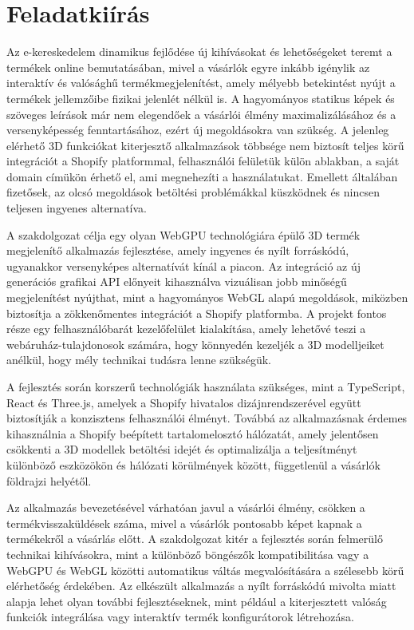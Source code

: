 \documentclass[12pt]{report}
\begin{document}
        \clearpage
        \pagestyle{plain}
        \chapter*{Feladatkiírás}
        \setcounter{page}{2}

        Az e-kereskedelem dinamikus fejlődése új kihívásokat és lehetőségeket teremt a termékek online bemutatásában, mivel a vásárlók egyre inkább igénylik az interaktív és valósághű termékmegjelenítést, amely mélyebb betekintést nyújt a termékek jellemzőibe fizikai jelenlét nélkül is. A hagyományos statikus képek és szöveges leírások már nem elegendőek a vásárlói élmény maximalizálásához és a versenyképesség fenntartásához, ezért új megoldásokra van szükség. A jelenleg elérhető 3D funkciókat kiterjesztő alkalmazások többsége nem biztosít teljes körű integrációt a Shopify platformmal, felhasználói felületük külön ablakban, a saját domain címükön érhető el, ami megnehezíti a használatukat. Emellett általában fizetősek, az olcsó megoldások betöltési problémákkal küszködnek és nincsen teljesen ingyenes alternatíva.
        
        A szakdolgozat célja egy olyan WebGPU technológiára épülő 3D termék megjelenítő alkalmazás fejlesztése, amely ingyenes és nyílt forráskódú, ugyanakkor versenyképes alternatívát kínál a piacon. Az integráció az új generációs grafikai API előnyeit kihasználva vizuálisan jobb minőségű megjelenítést nyújthat, mint a hagyományos WebGL alapú megoldások, miközben biztosítja a zökkenőmentes integrációt a Shopify platformba. A projekt fontos része egy felhasználóbarát kezelőfelület kialakítása, amely lehetővé teszi a webáruház-tulajdonosok számára, hogy könnyedén kezeljék a 3D modelljeiket anélkül, hogy mély technikai tudásra lenne szükségük.
        
        A fejlesztés során korszerű technológiák használata szükséges, mint a TypeScript, React és Three.js, amelyek a Shopify hivatalos dizájnrendszerével együtt biztosítják a konzisztens felhasználói élményt. Továbbá az alkalmazásnak érdemes kihasználnia a Shopify beépített tartalomelosztó hálózatát, amely jelentősen csökkenti a 3D modellek betöltési idejét és optimalizálja a teljesítményt különböző eszközökön és hálózati körülmények között, függetlenül a vásárlók földrajzi helyétől.
        
        Az alkalmazás bevezetésével várhatóan javul a vásárlói élmény, csökken a termékvisszaküldések száma, mivel a vásárlók pontosabb képet kapnak a termékekről a vásárlás előtt. A szakdolgozat kitér a fejlesztés során felmerülő technikai kihívásokra, mint a különböző böngészők kompatibilitása vagy a WebGPU és WebGL közötti automatikus váltás megvalósítására a szélesebb körű elérhetőség érdekében. Az elkészült alkalmazás a nyílt forráskódú mivolta miatt alapja lehet olyan további fejlesztéseknek, mint például a kiterjesztett valóság funkciók integrálása vagy interaktív termék konfigurátorok létrehozása.
\end{document}
